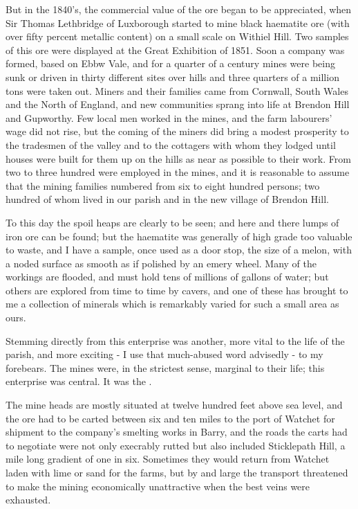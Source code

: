 But in the 1840’s, the commercial value of the ore began to be appreciated, when Sir Thomas Lethbridge of Luxborough started to mine black haematite ore (with over fifty percent metallic content) on a small scale on Withiel Hill. Two samples of this ore were displayed at the Great Exhibition of 1851. Soon a company was formed, based on Ebbw Vale, and for a quarter of a century mines were being sunk or driven in thirty different sites over hills and three quarters of a million tons were taken out. Miners and their families came from Cornwall, South Wales and the North of England, and new communities sprang into life at Brendon Hill and Gupworthy. Few local men worked in the mines, and the farm labourers’ wage did not rise, but the coming of the miners did bring a modest prosperity to the tradesmen of the valley and to the cottagers with whom they lodged until houses were built for them up on the hills as near as possible to their work. From two to three hundred were employed in the mines, and it is reasonable to assume that the mining families numbered from six to eight hundred persons; two hundred of whom lived in our parish and in the new village of Brendon Hill.

To this day the spoil heaps are clearly to be seen; and here and there lumps of iron ore can be found; but the haematite was generally of high grade too valuable to waste, and I have a sample, once used as a door stop, the size of a melon, with a noded surface as smooth as if polished by an emery wheel. Many of the workings are flooded, and must hold tens of millions of gallons of water; but others are explored from time to time by cavers, and one of these has brought to me a collection of minerals which is remarkably varied for such a small area as ours.

Stemming directly from this enterprise was another, more vital to the life of the parish, and more exciting - I use that much-abused word advisedly - to my forebears. The mines were, in the strictest sense, marginal to their life; this enterprise was central. It was the .

The mine heads are mostly situated at twelve hundred feet above sea level, and the ore had to be carted between six and ten miles to the port of Watchet for shipment to the company’s smelting works in Barry, and the roads the carts had to negotiate were not only execrably rutted but also included Sticklepath Hill, a mile long gradient of one in six. Sometimes they would return from Watchet laden with lime or sand for the farms, but by and large the transport threatened to make the mining economically unattractive when the best veins were exhausted.

